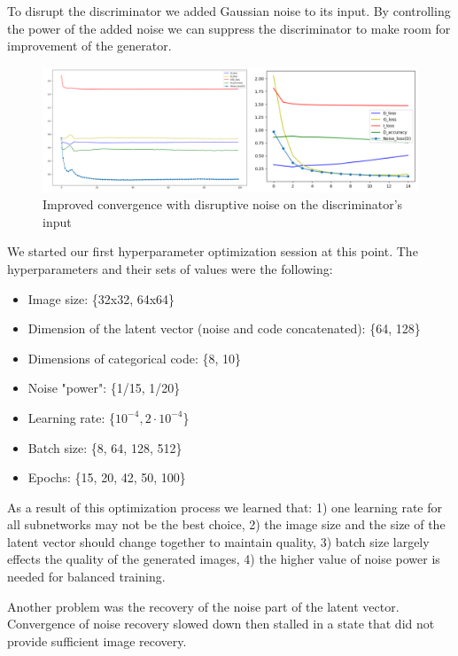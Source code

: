 \documentclass[10pt,journal,compsoc]{IEEEtran}
\begin{document}
To disrupt the discriminator we added Gaussian noise to its input. By controlling the power of the added noise we can suppress the discriminator to make room for improvement of the generator.

\begin{figure}[h]
	\centering
	\includegraphics[width=\linewidth]{pic/added_noise}
	\caption{Improved convergence with disruptive noise on the discriminator's input}
	\label{fig:added_noise}
\end{figure}

We started our first hyperparameter optimization session at this point. The hyperparameters and their sets of values were the following:

\begin{itemize}
	\item Image size: \{32x32, 64x64\}
	\item Dimension of the latent vector (noise and code concatenated): \{64, 128\}
	\item Dimensions of categorical code: \{8, 10\}
	\item Noise "power": \{1/15, 1/20\}
	\item Learning rate: \{$10^{-4}, 2 \cdot 10^{-4}$\}
	\item Batch size: \{8, 64, 128, 512\}
	\item Epochs: \{15, 20, 42, 50, 100\}
\end{itemize}

As a result of this optimization process we learned that: 1) one learning rate for all subnetworks may not be the best choice, 2) the image size and the size of the latent vector should change together to maintain quality, 3) batch size largely effects the quality of the generated images, 4) the higher value of noise power is needed for balanced training.

Another problem was the recovery of the noise part of the latent vector. Convergence of noise recovery slowed down then stalled in a state that did not provide sufficient image recovery.

\end{document}
